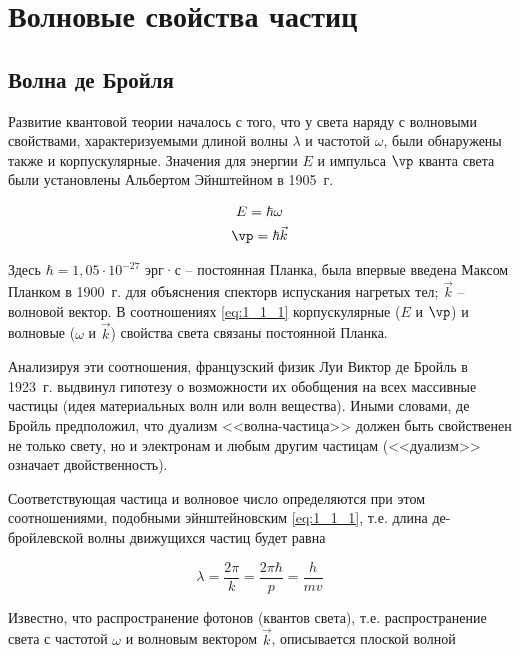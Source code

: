 \chapter{Волновые свойства частиц}

\section{Волна де Бройля}

Развитие квантовой теории началось с того, что у света наряду с волновыми свойствами, характеризуемыми длиной волны $\lambda$ и частотой $\omega$, были обнаружены также и корпускулярные. Значения для энергии $E$ и импульса $\vp$ кванта света были установлены Альбертом Эйнштейном в 1905~г.

\begin{equation}
\label{eq:1_1_1}
\begin{gathered}
E = \hbar \omega \\ 
\vp = \hbar \vec{k}
\end{gathered}
\end{equation}

Здесь $\hbar = 1{,}05 \cdot 10^{-27}$ эрг·с -- постоянная Планка, была впервые введена Максом Планком в 1900~г. для объяснения спекторв испускания нагретых тел; $\vec{k}$ -- волновой вектор. В соотношениях \eqref{eq:1_1_1} корпускулярные ($E$ и $\vp$) и волновые ($\omega$ и $\vec{k}$) свойства света связаны постоянной Планка.

Анализируя эти соотношения, французский физик Луи Виктор де Бройль в 1923~г. выдвинул гипотезу о возможности их обобщения на всех массивные частицы (идея материальных волн или волн вещества). Иными словами, де Бройль предположил, что дуализм <<волна-частица>> должен быть свойственен не только свету, но и электронам и любым другим частицам (<<дуализм>> означает двойственность).

Соответствующая частица и волновое число определяются при этом соотношениями, подобными эйнштейновским \eqref{eq:1_1_1}, т.е. длина де-бройлевской волны движущихся частиц будет равна

\begin{equation}
\label{eq:1_1_2}
\lambda = \frac{2\pi}{k} = \frac{2\pi \hbar}{p} = \frac{h}{mv}
\end{equation}

Известно, что распространение фотонов (квантов света), т.е. распространение света с частотой $\omega$ и волновым вектором $\vec{k}$, описывается плоской волной

